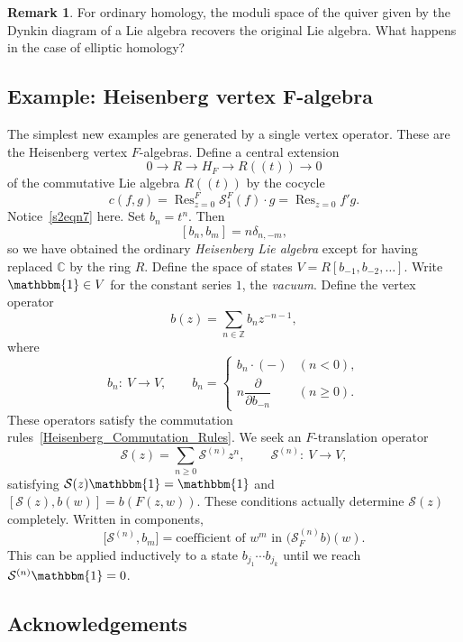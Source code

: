 \documentclass[pdftex]{sigma}
\numberwithin{equation}{section}
\theoremstyle{definition}
\newtheorem{Remark}[Theorem]{Remark}
\DeclareMathOperator\Res{Res}
\begin{document}
\begin{Remark}
For ordinary homology, the moduli space of the quiver given by the Dynkin diagram of a Lie algebra recovers the original Lie algebra. What happens in the case of elliptic homology?
\end{Remark}

\subsection[Example: Heisenberg vertex F-algebra]{Example: Heisenberg vertex $\boldsymbol{F}$-algebra}
\label{s44}

The simplest new examples are generated by a single vertex operator. These are the Heisenberg vertex $F$-algebras. Define a central extension
\[
 0\longrightarrow R\longrightarrow H_F\longrightarrow R(\!( t)\!)\longrightarrow0
\]
of the commutative Lie algebra $R(\!( t)\!)$ by the cocycle
\[
 c(f,g)=\Res^F_{z=0} \mathcal{S}_1^F(f)\cdot g=\Res_{z=0} f'g.
\]
Notice~\eqref{s2eqn7} here. Set $b_n=t^n$. Then
\begin{equation}
\label{Heisenberg_Commutation_Rules}
 [b_n,b_m]=n\delta_{n,-m},
\end{equation}
so we have obtained the ordinary \emph{Heisenberg Lie algebra} except for having replaced $\mathbb{C}$ by the ring $R$. Define the space of states
$
 V=R[b_{-1},b_{-2},\dots]$.
Write $\mathbbm{1}\in V$ for the constant series $1$, the \emph{vacuum}. Define the vertex operator
\[
 b(z)=\sum_{n\in\mathbb{Z}} b_nz^{-n-1},
\]
where
\[
 b_n\colon\ V\longrightarrow V,\qquad
 b_n
 =
 \begin{cases}
 b_n\cdot(-) &(n<0),\\
 n\dfrac{\partial}{\partial b_{-n}} & (n\geqslant0).
 \end{cases}
\]
These operators satisfy the commutation rules~\eqref{Heisenberg_Commutation_Rules}. We seek an $F$-translation operator
\[
 \mathcal{S}(z)=\sum_{n\geqslant0} \mathcal{S}^{(n)}z^n,\qquad \mathcal{S}^{(n)}\colon\ V\longrightarrow V,
\]
satisfying $\mathcal{S}(z)\mathbbm{1}=\mathbbm{1}$ and
$
 [\mathcal{S}(z), b(w)]=b(F(z,w))$.
These conditions actually determine $\mathcal{S}(z)$ completely. Written in components,
\[
 \big[\mathcal{S}^{(n)},b_m\big] = \text{coefficient of $w^m$ in }\bigl(\mathcal{S}^{(n)}_Fb\bigr)(w).
\]
This can be applied inductively to a state $b_{j_1}\cdots b_{j_k}$ until we reach $\mathcal{S}^{(n)}\mathbbm{1}=0$.

\subsection*{Acknowledgements}
\end{document}
